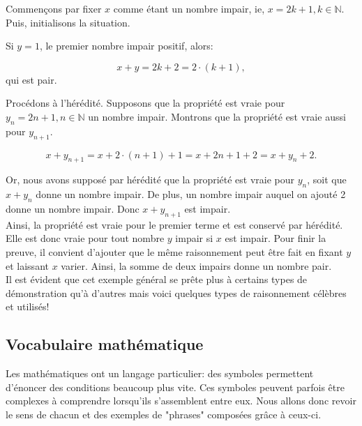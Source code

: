 \documentclass[a4paper, 12pt, french, twoside]{article}
\newcommand{\Nn}{{\mathbb{N}}}
\begin{document}
Commençons par fixer $x$ comme étant un nombre impair, ie, $x=2k+1, k\in \Nn$. Puis, initialisons la situation.

Si $y=1$, le premier nombre impair positif, alors:

\begin{equation}
    x+y=2k+2=2\cdot(k+1),
\end{equation}
qui est pair.

Procédons à l'hérédité. Supposons que la propriété est vraie pour $y_n=2n+1, n\in \Nn$ un nombre impair. Montrons que la propriété est vraie aussi pour $y_{n+1}$.

\begin{equation}
    x+y_{n+1}=x+2\cdot(n+1)+1=x+2n+1+2=x+y_n +2.
\end{equation}

Or, nous avons supposé par hérédité que la propriété est vraie pour $y_n$, soit que $x+y_n$ donne un nombre impair. De plus, un nombre impair auquel on ajouté 2 donne un nombre impair. Donc $x+y_{n+1}$ est impair. \\

Ainsi, la propriété est vraie pour le premier terme et est conservé par hérédité. Elle est donc vraie pour tout nombre $y$ impair si $x$ est impair. Pour finir la preuve, il convient d'ajouter que le même raisonnement peut être fait en fixant $y$ et laissant $x$ varier. Ainsi, la somme de deux impairs donne un nombre pair. \\
Il est évident que cet exemple général se prête plus à certains types de démonstration qu'à d'autres mais voici quelques types de raisonnement célèbres et utilisés! 
\subsection{Vocabulaire mathématique}

Les mathématiques ont un langage particulier: des symboles permettent d'énoncer des conditions beaucoup plus vite. Ces symboles peuvent parfois être complexes à comprendre lorsqu'ils s'assemblent entre eux. Nous allons donc revoir le sens de chacun et des exemples de "phrases" composées grâce à ceux-ci.
\end{document}

